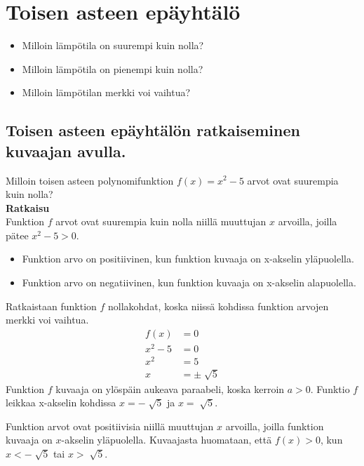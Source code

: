 \chapter{Toisen asteen epäyhtälö}
\begin{esimerkki}
\begin{itemize}
\item{Milloin lämpötila on suurempi kuin nolla?}
\item{Milloin lämpötila on pienempi kuin nolla?}
\item{Milloin lämpötilan merkki voi vaihtua?} 
\end{itemize}
\end{esimerkki}
\section{Toisen asteen epäyhtälön ratkaiseminen kuvaajan avulla.}
\begin{esimerkki}
Milloin toisen asteen polynomifunktion $f(x)=x^2-5$ arvot ovat suurempia kuin nolla?  \\
\textbf{Ratkaisu} \\
Funktion $f$ arvot ovat suurempia kuin nolla niillä muuttujan $x$ arvoilla, joilla pätee $x^2-5>0$. \\

\begin{itemize}
\item{Funktion arvo on positiivinen, kun funktion kuvaaja on x-akselin yläpuolella.}
\item{Funktion arvo on negatiivinen, kun funktion kuvaaja on x-akselin alapuolella.}
\end{itemize}
\begin{lukusuora}{-2.5}{2.5}{5}
\end{lukusuora}

Ratkaistaan funktion $f$ nollakohdat, koska niissä kohdissa funktion arvojen merkki voi vaihtua.
\begin{align*}
f(x)&=0 \\
x^2-5&=0 \\
x^2&=5 \\
x&=\pm \sqrt[]{5}
\end{align*}
Funktion $f$ kuvaaja on ylöspäin aukeava paraabeli, koska kerroin $a>0$.
Funktio $f$ leikkaa x-akselin kohdissa $x=-\sqrt[]{5}$ ja $x=\sqrt[]{5}$.

\begin{lukusuora}{-2.5}{2.5}{5}
\end{lukusuora}

Funktion arvot ovat positiivisia niillä muuttujan $x$ arvoilla, joilla funktion kuvaaja on $x$-akselin yläpuolella.
Kuvaajasta huomataan, että $f(x)>0$, kun $x<-\sqrt[]{5}$ tai $x>\sqrt[]{5}$. 
\end{esimerkki}

